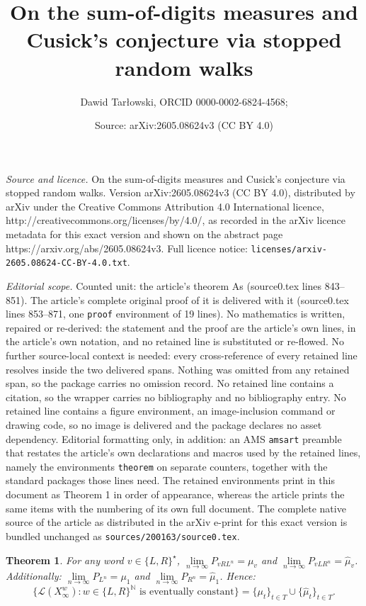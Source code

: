 \documentclass[10pt,a4paper]{amsart}
\title{On the sum-of-digits measures and Cusick's conjecture via stopped random walks}
\author{Dawid Tar\l{}owski, ORCID 0000-0002-6824-4568;}
\date{Source: arXiv:2605.08624v3 (CC BY 4.0)}
\newtheorem{theorem}{Theorem}
\newcommand{\LL}{\mathcal{L}}
\newcommand{\N}{\mathbb{N}}
\begin{document}
\maketitle

\noindent\emph{Source and licence.} On the sum-of-digits measures and Cusick's conjecture via stopped random walks. Version arXiv:2605.08624v3 (CC BY 4.0), distributed by arXiv under the Creative Commons Attribution 4.0 International licence, http://creativecommons.org/licenses/by/4.0/, as recorded in the arXiv licence metadata for this exact version and shown on the abstract page https://arxiv.org/abs/2605.08624v3. Full licence notice: \texttt{licenses/arxiv-2605.08624-CC-BY-4.0.txt}.\par\smallskip

\noindent\textit{Editorial scope.} Counted unit: the article's theorem As (source0.tex lines 843--851). The article's complete original proof of it is delivered with it (source0.tex lines 853--871, one \texttt{proof} environment of 19 lines). No mathematics is written, repaired or re-derived: the statement and the proof are the article's own lines, in the article's own notation, and no retained line is substituted or re-flowed.  No further source-local context is needed: every cross-reference of every retained line resolves inside the two delivered spans.  Nothing was omitted from any retained span, so the package carries no omission record.  No retained line contains a citation, so the wrapper carries no bibliography and no bibliography entry.  No retained line contains a figure environment, an image-inclusion command or drawing code, so no image is delivered and the package declares no asset dependency.  Editorial formatting only, in addition: an AMS \texttt{amsart} preamble that restates the article's own declarations and macros used by the retained lines, namely the environments \texttt{theorem} on separate counters, together with the standard packages those lines need.  The retained environments print in this document as Theorem 1 in order of appearance, whereas the article prints the same items with the numbering of its own full document.  The complete native source of the article as distributed in the arXiv e-print for this exact version is bundled unchanged as \texttt{sources/200163/source0.tex}.
\begin{theorem}\label{As}
  For any word $v\in\{L,R\}^{\star}$, $\lim\limits_{n\to\infty} P_{vRL^n}= \mu_v$ and $\lim\limits_{n\to\infty} P_{vLR^n}= \hat{\mu}_v$. 
Additionally: $\lim\limits_{n\to\infty}P_{L^n}=\mu_1$ and 
$\lim\limits_{n\to\infty}P_{R^n}=\hat{\mu}_1$. Hence:
 $$\{\LL(X^w_{\infty})\colon w \in\{L,R\}^\N\mbox{ is eventually constant}\}=\{\mu_t\}_{t\in T}\cup \{\hat{\mu}_t\}_{t\in T}.$$

\end{theorem}
\end{document}
